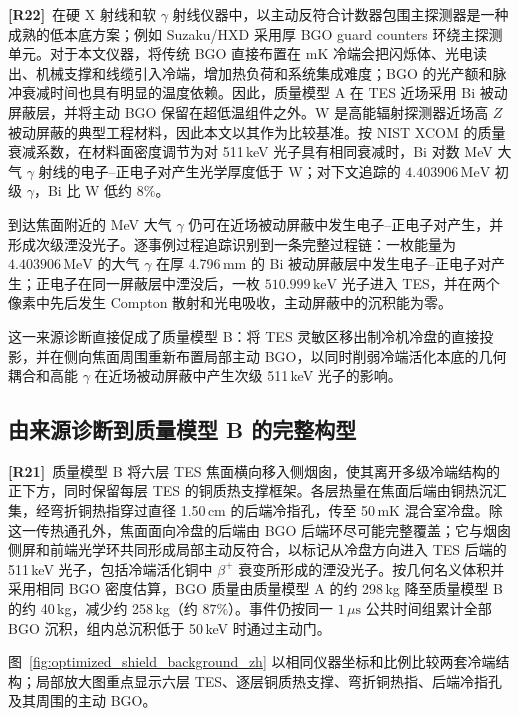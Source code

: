 \documentclass[11pt]{article}
\newcommand{\revmark}[1]{\textcolor{revisionblue}{\textbf{[R#1]}}\ }
\newcommand{\revblue}[1]{\textcolor{revisionblue}{#1}}
\newcommand{\keV}{\,\mathrm{keV}}
\newcommand{\MeV}{\,\mathrm{MeV}}
\begin{document}
\revmark{22}在硬 X 射线和软 $\gamma$ 射线仪器中，以主动反符合计数器包围主探测器是一种成熟的低本底方案；例如 Suzaku/HXD 采用厚 BGO guard counters 环绕主探测单元\cite{Takahashi2007HXD}。对于本文仪器，将传统 BGO 直接布置在 mK 冷端会把闪烁体、光电读出、机械支撑和线缆引入冷端，增加热负荷和系统集成难度；BGO 的光产额和脉冲衰减时间也具有明显的温度依赖\cite{Verdier2011BGO}。因此，质量模型 A 在 TES 近场采用 Bi 被动屏蔽层，并将主动 BGO 保留在超低温组件之外。W 是高能辐射探测器近场高 $Z$ 被动屏蔽的典型工程材料，因此本文以其作为比较基准。按 NIST XCOM 的质量衰减系数，在材料面密度调节为对 511\,keV 光子具有相同衰减时，Bi 对数 MeV 大气 $\gamma$ 射线的电子--正电子对产生光学厚度低于 W；对下文追踪的 $4.403906\MeV$ 初级 $\gamma$，Bi 比 W 低约 $8\%$\cite{NISTXCOM}。

到达焦面附近的 MeV 大气 $\gamma$ 仍可在近场被动屏蔽中发生电子--正电子对产生，并形成次级湮没光子。逐事例过程追踪识别到一条完整过程链：一枚能量为 $4.403906\MeV$ 的大气 $\gamma$ 在厚 4.796\,mm 的 Bi 被动屏蔽层中发生电子--正电子对产生；正电子在同一屏蔽层中湮没后，一枚 $510.999\keV$ 光子进入 TES，并在两个像素中先后发生 Compton 散射和光电吸收，主动屏蔽中的沉积能为零。

这一来源诊断直接促成了质量模型 B：将 TES 灵敏区移出制冷机冷盘的直接投影，并在侧向焦面周围重新布置局部主动 BGO，以同时削弱冷端活化本底的几何耦合和高能 $\gamma$ 在近场被动屏蔽中产生次级 511\,keV 光子的影响。
\endgroup

\FloatBarrier

\subsection{由来源诊断到质量模型 B 的完整构型}
\label{subsec:optimized_shield_results_zh}

\revmark{21}\revblue{质量模型 B 将六层 TES 焦面横向移入侧烟囱，使其离开多级冷端结构的正下方，同时保留每层 TES 的铜质热支撑框架。各层热量在焦面后端由铜热沉汇集，经弯折铜热指穿过直径 1.50\,cm 的后端冷指孔，传至 50\,mK 混合室冷盘。除这一传热通孔外，焦面面向冷盘的后端由 BGO 后端环尽可能完整覆盖；它与烟囱侧屏和前端光学环共同形成局部主动反符合，以标记从冷盘方向进入 TES 后端的 511\,keV 光子，包括冷端活化铜中 $\beta^+$ 衰变所形成的湮没光子。按几何名义体积并采用相同 BGO 密度估算，BGO 质量由质量模型 A 的约 298\,kg 降至质量模型 B 的约 40\,kg，减少约 258\,kg（约 $87\%$）。事件仍按同一 $1\,\mu\mathrm{s}$ 公共时间组累计全部 BGO 沉积，组内总沉积低于 50\,keV 时通过主动门。}

\revblue{图~\ref{fig:optimized_shield_background_zh} 以相同仪器坐标和比例比较两套冷端结构；局部放大图重点显示六层 TES、逐层铜质热支撑、弯折铜热指、后端冷指孔及其周围的主动 BGO。}
\end{document}
